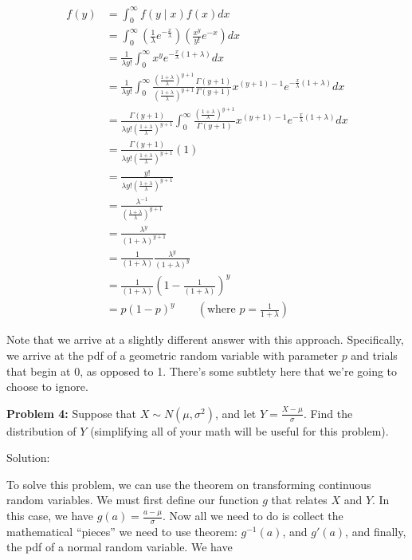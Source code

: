 \documentclass[
  letterpaper,
  DIV=11,
  numbers=noendperiod]{scrreprt}
\begin{document}
\begin{align*}
        f(y) &= \int_{0}^{\infty} f(y \mid x) f(x) dx \\
        &= \int_{0}^{\infty} (\frac{1}{\lambda}e^{-\frac{x}{\lambda}}) (\frac{x^y}{y!} e^{-x}) dx \\
        &= \frac{1}{\lambda y!} \int_{0}^{\infty} x^y e^{-\frac{x}{\lambda}(1 + \lambda)} dx \\
        &= \frac{1}{\lambda y!} \int_{0}^{\infty} \frac{(\frac{1+\lambda}{\lambda})^{y+1}}{(\frac{1+\lambda}{\lambda})^{y+1}} \frac{\Gamma(y+1)}{\Gamma(y+1)} x^{(y+1)-1} e^{-\frac{x}{\lambda}(1 + \lambda)} dx\\
        &= \frac{\Gamma(y+1)}{\lambda y! (\frac{1+\lambda}{\lambda})^{y+1}} \int_{0}^{\infty} \frac{(\frac{1+\lambda}{\lambda})^{y+1}}{\Gamma(y+1)} x^{(y+1)-1} e^{-\frac{x}{\lambda}(1 + \lambda)} dx\\
        &= \frac{\Gamma(y+1)}{\lambda y! (\frac{1+\lambda}{\lambda})^{y+1}} (1)\\
        &= \frac{y!}{\lambda y! (\frac{1+\lambda}{\lambda})^{y+1}} \\
        &= \frac{\lambda^{-1}}{(\frac{1+\lambda}{\lambda})^{y+1}}\\
        &= \frac{\lambda^y}{(1+\lambda)^{y+1}}\\
        &= \frac{1}{(1+\lambda)} \frac{\lambda^y}{(1+\lambda)^y}\\
        &= \frac{1}{(1+\lambda)} (1 - \frac{1}{(1+\lambda)})^y \\
        &=p(1-p)^y\qquad (\text{where }p=\frac{1}{1+\lambda})
    \end{align*}

Note that we arrive at a slightly different answer with this approach.
Specifically, we arrive at the pdf of a geometric random variable with
parameter \(p\) and trials that begin at 0, as opposed to 1. There's
some subtlety here that we're going to choose to ignore.

\textbf{Problem 4:} Suppose that \(X \sim N(\mu, \sigma^2)\), and let
\(Y = \frac{X - \mu}{\sigma}\). Find the distribution of \(Y\)
(simplifying all of your math will be useful for this problem).

Solution:

To solve this problem, we can use the theorem on transforming continuous
random variables. We must first define our function \(g\) that relates
\(X\) and \(Y\). In this case, we have
\(g(a) = \frac{a - \mu}{\sigma}\). Now all we need to do is collect the
mathematical ``pieces'' we need to use theorem: \(g^{-1}(a)\), and
\(g'(a)\), and finally, the pdf of a normal random variable. We have
\end{document}
